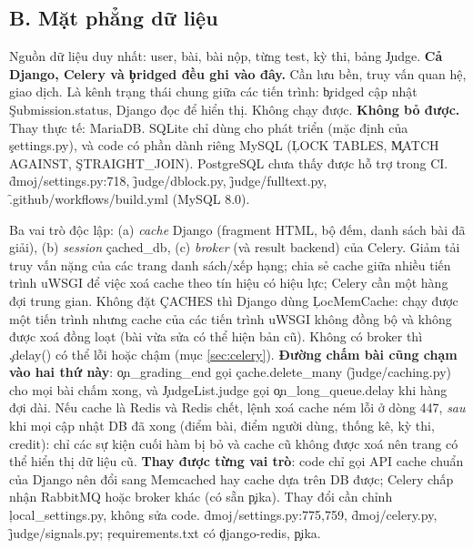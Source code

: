 \subsection*{B. Mặt phẳng dữ liệu}
{Nguồn dữ liệu duy nhất: user, bài, bài nộp, từng test, kỳ thi, bảng \c{Judge}. \textbf{Cả Django, Celery và \c{bridged} đều ghi vào đây.}}
{Cần lưu bền, truy vấn quan hệ, giao dịch. Là kênh trạng thái chung giữa các tiến trình: \c{bridged} cập nhật \c{Submission.status}, Django đọc để hiển thị.}
{Không chạy được.}
{\textbf{Không bỏ được.} Thay thực tế: MariaDB. SQLite chỉ dùng cho phát triển (mặc định của \c{settings.py}), và code có phần dành riêng MySQL (\c{LOCK TABLES}, \c{MATCH AGAINST}, \c{STRAIGHT_JOIN}). PostgreSQL chưa thấy được hỗ trợ trong CI.}
{\f{dmoj/settings.py:718}, \f{judge/dblock.py}, \f{judge/fulltext.py}, \f{.github/workflows/build.yml} (MySQL 8.0).}

{Ba vai trò độc lập: (a) \emph{cache} Django (fragment HTML, bộ đếm, danh sách bài đã giải), (b) \emph{session} \c{cached_db}, (c) \emph{broker} (và result backend) của Celery.}
{Giảm tải truy vấn nặng của các trang danh sách/xếp hạng; chia sẻ cache giữa nhiều tiến trình uWSGI để việc xoá cache theo tín hiệu có hiệu lực; Celery cần một hàng đợi trung gian.}
{Không đặt \c{CACHES} thì Django dùng \c{LocMemCache}: chạy được một tiến trình nhưng cache của các tiến trình uWSGI không đồng bộ và không được xoá đồng loạt (bài vừa sửa có thể hiện bản cũ). Không có broker thì \c{.delay()} có thể lỗi hoặc chậm (mục \ref{sec:celery}). \textbf{Đường chấm bài cũng chạm vào hai thứ này}: \c{on_grading_end} gọi \c{cache.delete_many} (\f{judge/caching.py}) cho mọi bài chấm xong, và \c{JudgeList.judge} gọi \c{on_long_queue.delay} khi hàng đợi dài. Nếu cache là Redis và Redis chết, lệnh xoá cache ném lỗi ở dòng 447, \emph{sau} khi mọi cập nhật DB đã xong (điểm bài, điểm người dùng, thống kê, kỳ thi, credit): chỉ các sự kiện cuối hàm bị bỏ và cache cũ không được xoá nên trang có thể hiển thị dữ liệu cũ. \tI}
{\textbf{Thay được từng vai trò}: code chỉ gọi API cache chuẩn của Django nên đổi sang Memcached hay cache dựa trên DB được; Celery chấp nhận RabbitMQ hoặc broker khác (có sẵn \c{pika}). Thay đổi cần chỉnh \c{local_settings.py}, không sửa code.}
{\f{dmoj/settings.py:775,759}, \f{dmoj/celery.py}, \f{judge/signals.py}; \c{requirements.txt} có \c{django-redis}, \c{pika}.}

